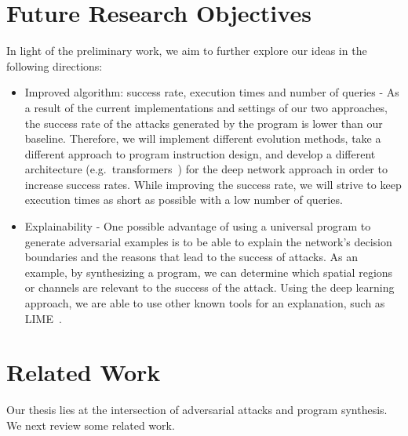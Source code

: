 \documentclass[11pt]{article}
\begin{document}
\section{Future Research Objectives}
In light of the preliminary work, we aim to further explore our ideas in the following directions:
\begin{itemize}
    \item Improved algorithm: success rate, execution times and number of queries - As a result of the current implementations and settings of our two approaches, the success rate of the attacks generated by the program is lower than our baseline.
    Therefore, we will implement different evolution methods, take a different approach to program instruction design, and develop a different architecture (e.g.\ transformers~\cite{vaswani2017attention}) for the deep network approach in order to increase success rates.
    While improving the success rate, we will strive to keep execution times as short as possible with a low number of queries.
    \item Explainability - One possible advantage of using a universal program to generate adversarial examples is to be able to explain the network's decision boundaries and the reasons that lead to the success of attacks.
    As an example, by synthesizing a program, we can determine which spatial regions or channels are relevant to the success of the attack.
    Using the deep learning approach, we are able to use other known tools for an explanation, such as LIME~\cite{ribeiro2016why}.
\end{itemize}

\section{Related Work}
Our thesis lies at the intersection of adversarial attacks and program synthesis. We next review some
related work.
\end{document}
